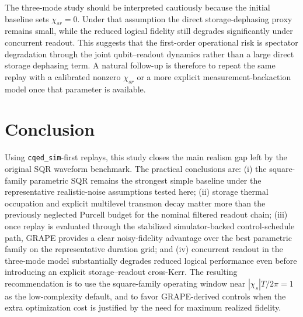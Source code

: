 \documentclass[twocolumn,prl,aps,floatfix]{revtex4-2}
\begin{document}
The three-mode study should be interpreted cautiously because the initial baseline sets \(\chi_{sr}=0\). Under that assumption the direct storage-dephasing proxy remains small,
while the reduced logical fidelity still degrades significantly under concurrent readout. This suggests that the first-order operational risk is spectator degradation through the
joint qubit--readout dynamics rather than a large direct storage dephasing term. A natural follow-up is therefore to repeat the same replay with a calibrated nonzero \(\chi_{sr}\)
or a more explicit measurement-backaction model once that parameter is available.

\section{Conclusion}

Using \texttt{cqed\_sim}-first replays, this study closes the main realism gap left by the original SQR waveform benchmark. The practical conclusions are: (i) the square-family
parametric SQR remains the strongest simple baseline under the representative realistic-noise assumptions tested here; (ii) storage thermal occupation and explicit multilevel transmon decay
matter more than the previously neglected Purcell budget for the nominal filtered readout chain; (iii) once replay is evaluated through the stabilized simulator-backed control-schedule path,
GRAPE provides a clear noisy-fidelity advantage over the best parametric family on the representative duration grid; and (iv) concurrent readout in the three-mode model substantially degrades
reduced logical performance even before introducing an explicit storage--readout cross-Kerr. The resulting recommendation is to use the square-family operating window near
$|\chi_s|T/2\pi = 1$ as the low-complexity default, and to favor GRAPE-derived controls when the extra optimization cost is justified by the need for maximum realized fidelity.



\end{document}
